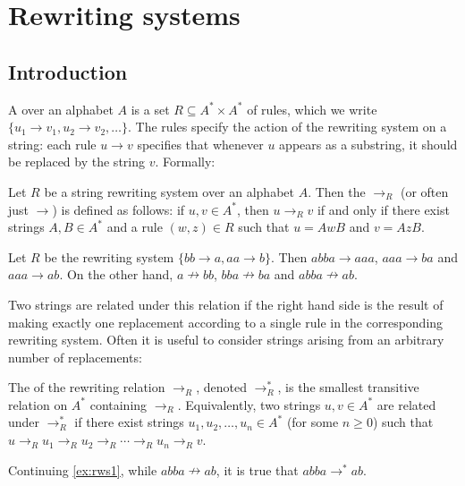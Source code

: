 \documentclass[noindex,noinsetproof,emphthm,12pt]{lmaths}
\begin{document}
\section{Rewriting systems} \label{sec:rewriting-systems}

\subsection{Introduction}

A  over an alphabet $A$ is a set $R \subseteq A^* \times A^*$ of rules, which we write $\{u_1 \to v_1, u_2 \to v_2, \ldots\}$. The rules specify the action of the rewriting system on a string: each rule $u \to v$ specifies that whenever $u$ appears as a substring, it should be replaced by the string $v$. Formally:

\begin{defn}
	Let $R$ be a string rewriting system over an alphabet $A$. Then the  $\to_R$ (or often just $\to$) is defined as follows: if $u, v \in A^*$, then $u \to_R v$ if and only if there exist strings $A, B \in A^*$ and a rule $(w, z) \in R$ such that $u = AwB$ and $v = AzB$.
\end{defn}

\begin{example} \label{ex:rws1}
	Let $R$ be the rewriting system $\{ bb \to a, aa \to b \}$. Then $abba \to aaa$, $aaa \to ba$ and $aaa \to ab$. On the other hand, $a \nrightarrow bb$, $bba \nrightarrow ba$ and $abba \nrightarrow ab$.
\end{example}

Two strings are related under this relation if the right hand side is the result of making exactly one replacement according to a single rule in the corresponding rewriting system. Often it is useful to consider strings arising from an arbitrary number of replacements:

\begin{defn}
	The  of the rewriting relation $\to_R$, denoted $\to_R^*$, is the smallest transitive relation on $A^*$ containing $\to_R$. Equivalently, two strings $u, v \in A^*$ are related under $\to_R^*$ if there exist strings $u_1, u_2, \ldots, u_n \in A^*$ (for some $n \ge 0$) such that $u \to_R u_1 \to_R u_2 \to_R \cdots \to_R u_n \to_R v$.
\end{defn}

Continuing \cref{ex:rws1}, while $abba \nrightarrow ab$, it is true that $abba \to^* ab$.
\end{document}
